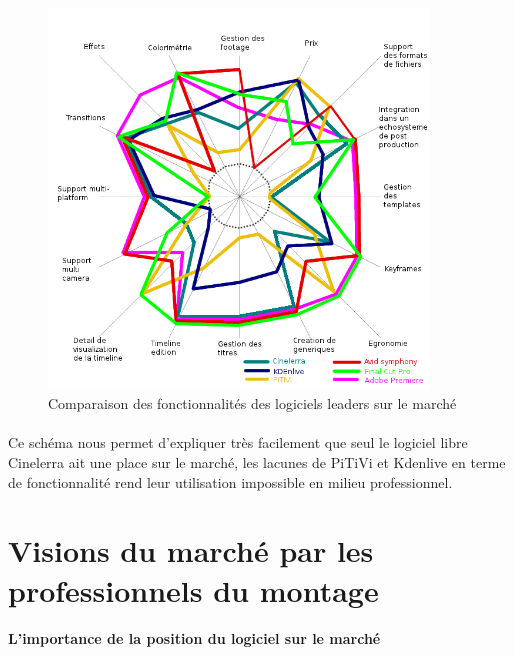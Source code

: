 \begin{figure} [H]

  \begin{center}

    \includegraphics[width=0.9\textwidth]{images/spiderDiagramFeaturesComparision}

  \end{center}

  \caption{Comparaison des fonctionnalités des logiciels leaders sur
  le marché}

  \label{Yes}

\end{figure}

\paragraph {}

Ce schéma nous permet d'expliquer très facilement que seul le logiciel
libre Cinelerra ait une place sur le marché, les lacunes de PiTiVi et
Kdenlive en terme de fonctionnalité rend leur utilisation impossible
en milieu professionnel.

\newpage

\section{Visions du marché par les professionnels du montage}

\paragraph{L'importance de la position du logiciel sur le marché}

